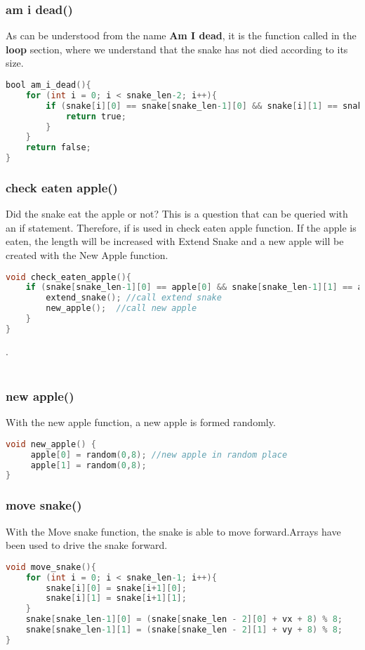 \documentclass[onecolumn]{article}
\begin{document}
\subsubsection{am i dead()}

As can be understood from the name\textbf{ Am I dead}, it is the function called in the \textbf{loop} section, where we understand that the snake has not died according to its size.

\begin{lstlisting}[language=C, caption= Am I dead]
bool am_i_dead(){
    for (int i = 0; i < snake_len-2; i++){
        if (snake[i][0] == snake[snake_len-1][0] && snake[i][1] == snake[snake_len-1][1]){
            return true;
        }
    }
    return false;
}
\end{lstlisting}

\subsubsection{check eaten apple()}

Did the snake eat the apple or not? This is a question that can be queried with an if statement. Therefore, if is used in check eaten apple function. If the apple is eaten, the length will be increased with Extend Snake and a new apple will be created with the New Apple function.

\begin{lstlisting}[language=C, caption= Check Eaten Apple]
void check_eaten_apple(){
    if (snake[snake_len-1][0] == apple[0] && snake[snake_len-1][1] == apple[1]){    //eaten an apple
        extend_snake(); //call extend snake
        new_apple();  //call new apple
    }
}
\end{lstlisting}
.\\\\
\subsubsection{new apple()}

With the new apple function, a new apple is formed randomly.

\begin{lstlisting}[language=C, caption= New Apple]
void new_apple() {
     apple[0] = random(0,8); //new apple in random place
     apple[1] = random(0,8);
}
\end{lstlisting}

\subsubsection{move snake()}
With the Move snake function, the snake is able to move forward.Arrays have been used to drive the snake forward.
\begin{lstlisting}[language=C, caption= Move Snake]
void move_snake(){
    for (int i = 0; i < snake_len-1; i++){
        snake[i][0] = snake[i+1][0];
        snake[i][1] = snake[i+1][1];
    }
    snake[snake_len-1][0] = (snake[snake_len - 2][0] + vx + 8) % 8;
    snake[snake_len-1][1] = (snake[snake_len - 2][1] + vy + 8) % 8;
}
\end{lstlisting}
\end{document}
